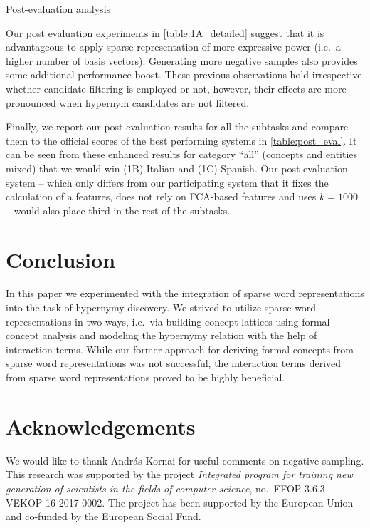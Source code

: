 \documentclass{beamer}
\newlength{\onecolwid}
\begin{document}
\begin{frame}[t]
\begin{columns}[t]
\begin{column}{\onecolwid}
\begin{block}{Post-evaluation analysis}


Our post evaluation experiments in \autoref{table:1A_detailed} suggest that it 
is advantageous to apply sparse representation of more expressive power (i.e.~a 
higher number of basis vectors). Generating more negative samples also provides 
some additional performance boost. These previous observations hold 
irrespective whether candidate filtering is employed or not, however, their 
effects are more pronounced when hypernym candidates are not filtered.

Finally, we report our post-evaluation results for all the subtasks and compare
them to the official scores  of the best performing systems in 
\autoref{table:post_eval}. It can be seen from these enhanced results for 
category ``all'' (concepts and entities mixed) that we would win (1B) Italian 
and (1C) Spanish. Our post-evaluation system -- which only differs from our 
participating system that it fixes the calculation of a features, does 
not rely on FCA-based features and uses $k=1000$ -- would also place third in 
the rest of the subtasks.


\end{block}

\section{Conclusion}

In this paper we experimented with the integration of sparse word 
representations into the task of hypernymy discovery. We strived to utilize 
sparse word representations in two ways, i.e.~via building concept lattices 
using formal concept analysis and modeling the hypernymy relation with the help 
of interaction terms. While our former approach for deriving formal concepts 
from sparse word representations was not successful, the interaction terms 
derived from sparse word representations proved to be highly beneficial.

\section*{Acknowledgements}

We would like to thank András Kornai for useful comments on negative sampling.
This research was supported by the project \emph{Integrated program for
training new generation of scientists in the fields of computer science},
no.~EFOP-3.6.3-VEKOP-16-2017-0002. The project has been supported by the
European Union and co-funded by the European Social Fund.


\end{column}
\end{columns}
\end{frame}
\end{document}
